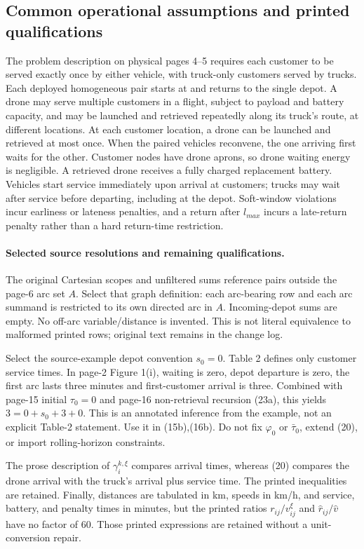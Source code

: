 \documentclass[10pt]{article}
\begin{document}
\subsection*{Common operational assumptions and printed qualifications}
The problem description on physical pages 4--5 requires each customer to be served exactly once by either vehicle, with truck-only customers served by trucks. Each deployed homogeneous pair starts at and returns to the single depot. A drone may serve multiple customers in a flight, subject to payload and battery capacity, and may be launched and retrieved repeatedly along its truck's route, at different locations. At each customer location, a drone can be launched and retrieved at most once. When the paired vehicles reconvene, the one arriving first waits for the other. Customer nodes have drone aprons, so drone waiting energy is negligible. A retrieved drone receives a fully charged replacement battery. Vehicles start service immediately upon arrival at customers; trucks may wait after service before departing, including at the depot. Soft-window violations incur earliness or lateness penalties, and a return after $l_{max}$ incurs a late-return penalty rather than a hard return-time restriction.

\paragraph{Selected source resolutions and remaining qualifications.}
The original Cartesian scopes and unfiltered sums reference pairs outside the
page-6 arc set $A$. Select that graph definition: each arc-bearing row and
each arc summand is restricted to its own directed arc in $A$. Incoming-depot
sums are empty. No off-arc variable/distance is invented. This is not literal
equivalence to malformed printed rows; original text remains in the change log.

Select the source-example depot convention $s_0=0$. Table 2 defines only customer
service times. In page-2 Figure 1(i), waiting is zero, depot departure is zero,
the first arc lasts three minutes and first-customer arrival is three.
Combined with page-15 initial $\tau_0=0$ and page-16 non-retrieval recursion
(23a), this yields $3=0+s_0+3+0$. This is an annotated inference from the example,
not an explicit Table-2 statement. Use it in (15b),(16b). Do not fix
$\varphi_0$ or $\bar\tau_0$, extend (20), or import rolling-horizon constraints.

The prose description of $\gamma_i^{k,\xi}$ compares arrival times, whereas (20) compares the drone arrival with the truck's arrival plus service time. The printed inequalities are retained. Finally, distances are tabulated in km, speeds in km/h, and service, battery, and penalty times in minutes, but the printed ratios $r_{ij}/v_{ij}^\xi$ and $\hat r_{ij}/\hat v$ have no factor of 60. Those printed expressions are retained without a unit-conversion repair.
\end{document}
